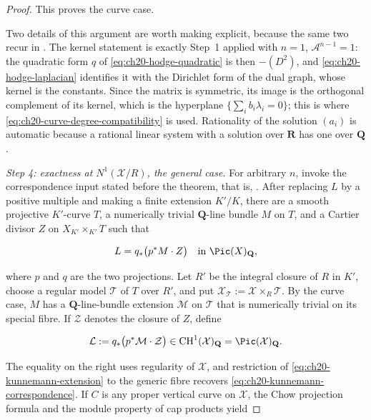 \begin{proof}
This proves the curve case.

Two details of this argument are worth making explicit, because the same
two recur in .  The kernel statement is exactly
Step~1 applied with \(n=1\), \(\mathcal A^{n-1}=1\): the quadratic form
\(q\) of \eqref{eq:ch20-hodge-quadratic} is then
\(-(D^2)\), and \eqref{eq:ch20-hodge-laplacian} identifies it with the
Dirichlet form of the dual graph, whose kernel is the constants.  Since the
matrix is symmetric, its image is the orthogonal complement of its kernel,
which is the hyperplane \(\{\sum_ib_i\lambda_i=0\}\); this is where
\eqref{eq:ch20-curve-degree-compatibility} is used.  Rationality of the
solution \((a_i)\) is automatic because a rational linear system with a
solution over \(\mathbf R\) has one over \(\mathbf Q\).

\emph{Step 4: exactness at \(N^1(\mathcal X/R)\), the general case.}
For arbitrary \(n\), invoke the correspondence input stated before the
theorem, that is, .  After replacing \(L\) by
a positive multiple and making a finite
extension \(K'/K\), there are a smooth projective \(K'\)-curve \(T\), a
numerically trivial \(\mathbf Q\)-line bundle \(M\) on \(T\), and a Cartier
divisor \(Z\) on \(X_{K'}\times_{K'}T\) such that

\begin{equation}
\label{eq:ch20-kunnemann-correspondence}
                  L=q_*\bigl(p^*M\cdot Z\bigr)
                  \quad\text{in }\Pic(X)_{\mathbf Q},
\end{equation}

where \(p\) and \(q\) are the two projections.  Let \(R'\) be the integral
closure of \(R\) in \(K'\), choose a regular model \(\mathcal T\) of
\(T\) over \(R'\), and put
\(\mathcal X_{\mathcal T}:=\mathcal X\times_R\mathcal T\).  By the curve
case, \(M\) has a \(\mathbf Q\)-line-bundle extension \(\mathcal M\) on
\(\mathcal T\) that is numerically trivial on its special fibre.  If
\(\mathcal Z\) denotes the closure of \(Z\), define

\begin{equation}
\label{eq:ch20-kunnemann-extension}
             \mathcal L:=q_*\bigl(p^*\mathcal M\cdot\mathcal Z\bigr)
             \in\operatorname{CH}^1(\mathcal X)_{\mathbf Q}
             =\Pic(\mathcal X)_{\mathbf Q}.
\end{equation}

The equality on the right uses regularity of \(\mathcal X\), and restriction
of \eqref{eq:ch20-kunnemann-extension} to the generic fibre recovers
\eqref{eq:ch20-kunnemann-correspondence}.  If \(C\) is any proper vertical
curve on \(\mathcal X\), the Chow projection formula and the module property
of cap products yield


\end{proof}

